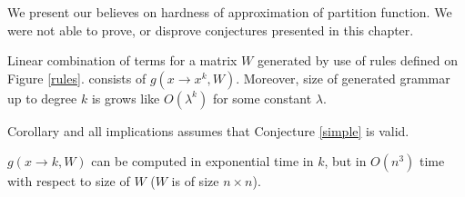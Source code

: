 We present our believes on hardness of approximation of partition function. 
We were not able to prove, or disprove conjectures presented in this chapter.
\begin{conjecture}
Linear combination of terms for a matrix $W$ generated by use of rules defined on Figure \ref{rules}.
consists of $g(x \rightarrow x^k, W)$. Moreover, size of generated grammar
up to degree $k$ is grows like $O(\lambda^k)$ for some constant $\lambda$.
\label{simple}
\end{conjecture}

Corollary and all implications assumes that Conjecture \ref{simple} is valid.

\begin{corollary}
	$g(x \rightarrow k, W)$
	can be computed in exponential time in $k$, but in $O(n^3)$ time with respect to size of $W$ ($W$ is of size $n \times n$).
\end{corollary}

